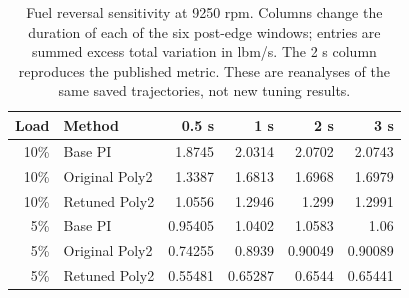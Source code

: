 \begin{table}[htbp]\centering\small
\begin{tabular}{@{}rlrrrr@{}}\toprule
Load & Method & 0.5 s & 1 s & 2 s & 3 s\\\midrule
10\% & Base PI & 1.8745 & 2.0314 & 2.0702 & 2.0743\\
10\% & Original Poly2 & 1.3387 & 1.6813 & 1.6968 & 1.6979\\
10\% & Retuned Poly2 & 1.0556 & 1.2946 & 1.299 & 1.2991\\
5\% & Base PI & 0.95405 & 1.0402 & 1.0583 & 1.06\\
5\% & Original Poly2 & 0.74255 & 0.8939 & 0.90049 & 0.90089\\
5\% & Retuned Poly2 & 0.55481 & 0.65287 & 0.6544 & 0.65441\\
\bottomrule\end{tabular}
\caption{Fuel reversal sensitivity at 9250 rpm. Columns change the duration of each of the six post-edge windows; entries are summed excess total variation in lbm/s. The 2 s column reproduces the published metric. These are reanalyses of the same saved trajectories, not new tuning results.}\label{tab:sensitivity_ring}
\end{table}
